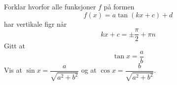 Forklar hvorfor alle funksjoner $ f $ på formen
\[ f(x)= a \tan (kx+c)+d\]
har vertikale figr når
\[ kx+c=\pm \frac{\pi}{2}+\pi n \]
\newpage
{}
Gitt at
\[ \tan x = \frac{a}{b} \]
Vis at $ \sin x = \dfrac{a}{\sqrt{a^2+b^2}} $ og at $ \cos x = \dfrac{b}{\sqrt{a^2+b^2}} $.

